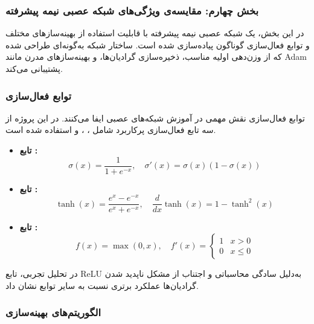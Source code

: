 	
	
	
	
\subsubsection{بخش چهارم: مقایسه‌ی ویژگی‌های شبکه عصبی نیمه پیشرفته}
	
	در این بخش، یک شبکه عصبی نیمه پیشرفته با قابلیت استفاده از بهینه‌سازهای مختلف و توابع فعال‌سازی گوناگون پیاده‌سازی شده است. ساختار شبکه به‌گونه‌ای طراحی شده که از وزن‌دهی اولیه مناسب، ذخیره‌سازی گرادیان‌ها، و بهینه‌سازهای مدرن مانند Adam پشتیبانی می‌کند. 
	
	\subsubsection{توابع فعال‌سازی}
	
	توابع فعال‌سازی نقش مهمی در آموزش شبکه‌های عصبی ایفا می‌کنند. در این پروژه از سه تابع فعال‌سازی پرکاربرد شامل ، ، و  استفاده شده است.
	
	\begin{itemize}
		\item \textbf{تابع :}
		\[
		\sigma(x) = \frac{1}{1 + e^{-x}}, \quad \sigma'(x) = \sigma(x)(1 - \sigma(x))
		\]
		
		\item \textbf{تابع :}
		\[
		\tanh(x) = \frac{e^x - e^{-x}}{e^x + e^{-x}}, \quad \frac{d}{dx} \tanh(x) = 1 - \tanh^2(x)
		\]
		
		\item \textbf{تابع :}
		\[
		f(x) = \max(0, x), \quad f'(x) = \begin{cases}
			1 & x > 0 \\
			0 & x \leq 0
		\end{cases}
		\]
	\end{itemize}

	
	در تحلیل تجربی، تابع ReLU به‌دلیل سادگی محاسباتی و اجتناب از مشکل ناپدید شدن گرادیان‌ها عملکرد برتری نسبت به سایر توابع نشان داد.
	
	\subsubsection{الگوریتم‌های بهینه‌سازی}
	
